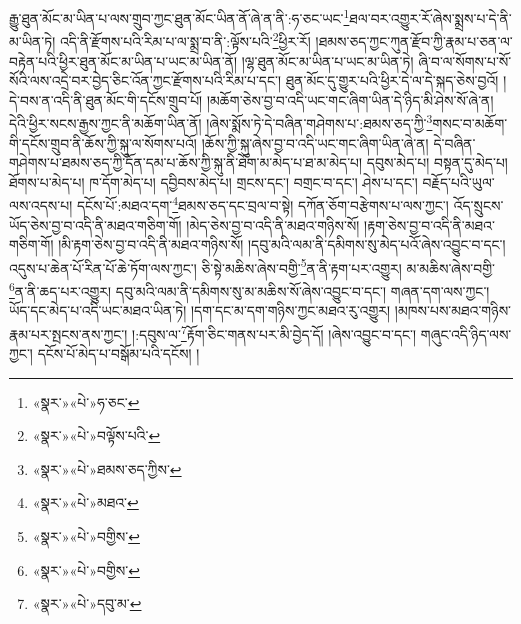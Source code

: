 རྒྱུ་ཐུན་མོང་མ་ཡིན་པ་ལས་གྲུབ་ཀྱང་ཐུན་མོང་ཡིན་ནོ་ཞེ་ན་ནི་:ཧ་ཅང་ཡང་\footnote{«སྣར་»«པེ་»ཧ་ཅང་}ཐལ་བར་འགྱུར་རོ་ཞེས་སྨྲས་པ་དེ་ནི་མ་ཡིན་ཏེ། འདི་ནི་རྫོགས་པའི་རིམ་པ་ལ་སྨྲ་བ་ནི་:ལྟོས་པའི་\footnote{«སྣར་»«པེ་»བལྟོས་པའི་}ཕྱིར་རོ། །ཐམས་ཅད་ཀྱང་ཀུན་རྫོབ་ཀྱི་རྣམ་པ་ཅན་ལ་བརྟེན་པའི་ཕྱིར་ཐུན་མོང་མ་ཡིན་པ་ཡང་མ་ཡིན་ནོ། །ལྷ་ཐུན་མོང་མ་ཡིན་པ་ཡང་མ་ཡིན་ཏེ། ཞི་བ་ལ་སོགས་པ་སོ་སོའི་ལས་འདྲེ་བར་བྱེད་ཅིང་འོན་ཀྱང་རྫོགས་པའི་རིམ་པ་དང་། ཐུན་མོང་དུ་གྱུར་པའི་ཕྱིར་དེ་ལ་དེ་སྐད་ཅེས་བྱའོ། །དེ་བས་ན་འདི་ནི་ཐུན་མོང་གི་དངོས་གྲུབ་པོ། །མཆོག་ཅེས་བྱ་བ་འདི་ཡང་གང་ཞིག་ཡིན་དེ་ཉིད་མི་ཤེས་སོ་ཞེ་ན། དེའི་ཕྱིར་སངས་རྒྱས་ཀྱང་ནི་མཆོག་ཡིན་ནོ། །ཞེས་སྨོས་ཏེ་དེ་བཞིན་གཤེགས་པ་:ཐམས་ཅད་ཀྱི་\footnote{«སྣར་»«པེ་»ཐམས་ཅད་ཀྱིས་}གསང་བ་མཆོག་གི་དངོས་གྲུབ་ནི་ཆོས་ཀྱི་སྐུ་ལ་སོགས་པའོ། །ཆོས་ཀྱི་སྐུ་ཞེས་བྱ་བ་འདི་ཡང་གང་ཞིག་ཡིན་ཞེ་ན། དེ་བཞིན་གཤེགས་པ་ཐམས་ཅད་ཀྱི་དོན་དམ་པ་ཆོས་ཀྱི་སྐུ་ནི་ཐོག་མ་མེད་པ་ཐ་མ་མེད་པ། དབུས་མེད་པ། བསྟན་དུ་མེད་པ། ཐོགས་པ་མེད་པ། ཁ་དོག་མེད་པ། དབྱིབས་མེད་པ། གྲངས་དང་། བགྲང་བ་དང་། ཤེས་པ་དང་། བརྗོད་པའི་ཡུལ་ལས་འདས་པ། དངོས་པོ་:མཐའ་དག་\footnote{«སྣར་»«པེ་»མཐའ་}ཐམས་ཅད་དང་བྲལ་བ་སྟེ། དཀོན་ཅོག་བརྩེགས་པ་ལས་ཀྱང་། འོད་སྲུངས་ཡོད་ཅེས་བྱ་བ་འདི་ནི་མཐའ་གཅིག་གོ། །མེད་ཅེས་བྱ་བ་འདི་ནི་མཐའ་གཉིས་སོ། །རྟག་ཅེས་བྱ་བ་འདི་ནི་མཐའ་གཅིག་གོ། །མི་རྟག་ཅེས་བྱ་བ་འདི་ནི་མཐའ་གཉིས་སོ། །དབུ་མའི་ལམ་ནི་དམིགས་སུ་མེད་པའོ་ཞེས་འབྱུང་བ་དང་། འདུས་པ་ཆེན་པོ་རིན་པོ་ཆེ་ཏོག་ལས་ཀྱང་། ཅི་སྟེ་མཆིས་ཞེས་བགྱི་\footnote{«སྣར་»«པེ་»བགྱིས་}ན་ནི་རྟག་པར་འགྱུར། མ་མཆིས་ཞེས་བགྱི་\footnote{«སྣར་»«པེ་»བགྱིས་}ན་ནི་ཆད་པར་འགྱུར། དབུ་མའི་ལམ་ནི་དམིགས་སུ་མ་མཆིས་སོ་ཞེས་འབྱུང་བ་དང་། གཞན་དག་ལས་ཀྱང་། ཡོད་དང་མེད་པ་འདི་ཡང་མཐའ་ཡིན་ཏེ། །དག་དང་མ་དག་གཉིས་ཀྱང་མཐའ་རུ་འགྱུར། །མཁས་པས་མཐའ་གཉིས་རྣམ་པར་སྤངས་ནས་ཀྱང་། །:དབུས་ལ་\footnote{«སྣར་»«པེ་»དབུ་མ་}རྟོག་ཅིང་གནས་པར་མི་བྱེད་དོ། །ཞེས་འབྱུང་བ་དང་། གཞུང་འདི་ཉིད་ལས་ཀྱང་། དངོས་པོ་མེད་པ་བསྒོམ་པའི་དངོས། །
